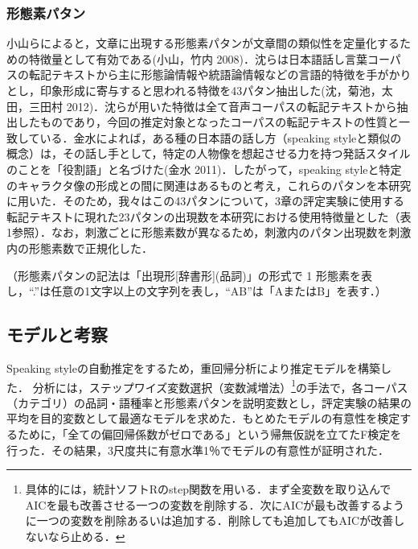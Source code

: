 \documentclass[japanese]{jnlp_1.4}
\begin{document}
\subsubsection{形態素パタン}

小山らによると，文章に出現する形態素パタンが文章間の類似性を定量化するための特徴量として有効である(小山，竹内 2008)．沈らは日本語話し言葉コーパスの転記テキストから主に形態論情報や統語論情報などの言語的特徴を手がかりとし，印象形成に寄与すると思われる特徴を43パタン抽出した(沈，菊池，太田，三田村 2012)．沈らが用いた特徴は全て音声コーパスの転記テキストから抽出したものであり，今回の推定対象となったコーパスの転記テキストの性質と一致している．金水によれば，ある種の日本語の話し方（speaking styleと類似の概念）は，その話し手として，特定の人物像を想起させる力を持つ発話スタイルのことを「役割語」と名づけた(金水 2011)．したがって，speaking styleと特定のキャラクタ像の形成との間に関連はあるものと考え，これらのパタンを本研究に用いた．そのため，我々はこの43パタンについて，3章の評定実験に使用する転記テキストに現れた23パタンの出現数を本研究における使用特徴量とした（表1参照）．なお，刺激ごとに形態素数が異なるため，刺激内のパタン出現数を刺激内の形態素数で正規化した．

\begin{table}[t]
\caption{形態素パタン}

\vspace{4pt}\small
（形態素パタンの記法は「出現形[辞書形](品詞)」の形式で 1 形態素を表し，``.''は任意の1文字以上の文字列を表し，``A\textbar B''は「AまたはB」を表す．）
\par
\end{table}

\subsection{モデルと考察}

Speaking styleの自動推定をするため，重回帰分析により推定モデルを構築した．
分析には，ステップワイズ変数選択（変数減増法）\footnote{具体的には，統計ソフトRのstep関数を用いる．まず全変数を取り込んでAICを最も改善させる一つの変数を削除する．次にAICが最も改善するように一つの変数を削除あるいは追加する．削除しても追加してもAICが改善しないなら止める．}の手法で，各コーパス（カテゴリ）の品詞・語種率と形態素パタンを説明変数とし，評定実験の結果の平均を目的変数として最適なモデルを求めた．もとめたモデルの有意性を検定するために，「全ての偏回帰係数がゼロである」という帰無仮説を立てたF検定を行った．その結果，3尺度共に有意水準1％でモデルの有意性が証明された．

\begin{table}[t]
\caption{交差検定(leave-1-out)の結果（決定係数/調整済決定係数）}

\end{table}
\end{document}
